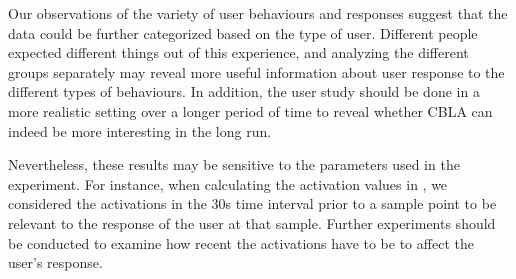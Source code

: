 Our observations of the variety of user behaviours and responses suggest that the data could be further categorized based on the type of user. Different people expected different things out of this experience, and analyzing the different groups separately may reveal more useful information about user response to the different types of behaviours. In addition, the user study should be done in a more realistic setting over a longer period of time to reveal whether CBLA can indeed be more interesting in the long run.


Nevertheless, these results may be sensitive to the parameters used in the experiment. For instance, when calculating the activation values in , we considered the activations in the 30s time interval prior to a sample point to be relevant to the response of the user at that sample. Further experiments should be conducted to examine how recent the activations have to be to affect the user's response.


